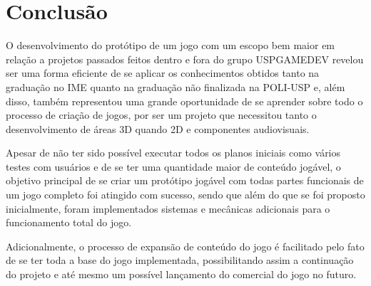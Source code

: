 \documentclass[
	12pt,				%
	openright,			%
	twoside,			%
	a4paper,			%
	english,			%
	french,				%
	spanish,			%
	brazil				%
	]{abntex2}
\begin{document}
\chapter{Conclusão}

	O desenvolvimento do protótipo de um jogo com um escopo bem maior em relação a projetos passados feitos dentro e fora do grupo USPGAMEDEV revelou ser uma forma eficiente de se aplicar os conhecimentos obtidos tanto na graduação no IME quanto na graduação não finalizada na POLI-USP e, além disso, também representou uma grande oportunidade de se aprender sobre todo o processo de criação de jogos, por ser um projeto que necessitou tanto o desenvolvimento de áreas 3D quando 2D e componentes audiovisuais.
	
	Apesar de não ter sido possível executar todos os planos iniciais como vários testes com usuários e de se ter uma quantidade maior de conteúdo jogável, o objetivo principal de se criar um protótipo jogável com todas partes funcionais de um jogo completo foi atingido com sucesso, sendo que além do que se foi proposto inicialmente, foram implementados sistemas e mecânicas adicionais para o funcionamento total do jogo.
	
	Adicionalmente, o processo de expansão de conteúdo do jogo é facilitado pelo fato de se ter toda a base do jogo implementada, possibilitando assim a continuação do projeto e até mesmo um possível lançamento do comercial do jogo no futuro.








%
%




\end{document}
